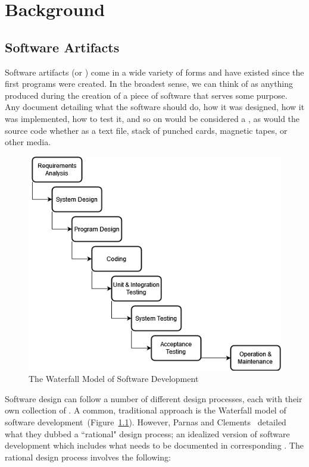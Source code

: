 \chapter{Background}
\section{Software Artifacts}
\label{sec:sfs}

Software artifacts (or \sfs{}) come in a wide variety of forms and have existed 
since the first programs were created. In the broadest sense, we can think of 
\sfs{} as anything produced during the creation of a piece of software that 
serves some purpose. Any document detailing what the software should do, how it 
was designed, how it was implemented, how to test it, and so on would be 
considered a \sf{}, as would the source code whether as a text file, stack of 
punched cards, magnetic tapes, or other media.

\begin{figure}
\includegraphics[width=\linewidth]{figures/Waterfall.png}
\caption{The Waterfall Model of Software Development}
\label{fig:Waterfall}
\end{figure}

Software design can follow a number of different design processes, each with 
their own collection of \sfs{}. A common, traditional approach is the Waterfall 
model of software 
development~\cite{PfleegerAndAtlee2010Ch2}(Figure~\ref{fig:Waterfall}). 
However, Parnas and Clements~\cite{ParnasAndClements1986} detailed what they 
dubbed a ``rational" design process; an idealized version of software 
development which includes what needs to be documented in corresponding \sfs{}. 
The rational design process involves the following:

